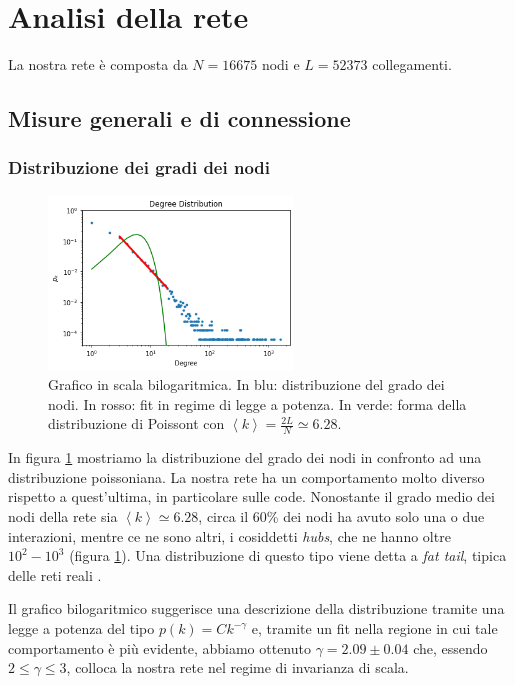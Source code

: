 \section{Analisi della rete}\label{misuregenerali}

    La nostra rete è composta da $N = 16675$ nodi e $L = 52373$ collegamenti.
    
    \subsection{Misure generali e di connessione}
    
    \subsubsection{Distribuzione dei gradi dei nodi}
        
        \begin{figure}[ht]
            \centering
            \includegraphics[width=6.5cm]{3_analysis_network/degree.png}
            \caption{Grafico in scala bilogaritmica. In blu: distribuzione del grado dei nodi. In rosso: fit in regime di legge a potenza. In verde: forma della distribuzione di Poissont con $\left<k\right>=\frac{2L}{N}\simeq6.28$.}
            \label{Degree_distribution}
        \end{figure}
        
        In figura \ref{Degree_distribution} mostriamo la distribuzione del grado dei nodi in confronto ad una distribuzione poissoniana. La nostra rete ha un comportamento molto diverso rispetto a quest'ultima, in particolare sulle code.
        Nonostante il grado medio dei nodi della rete sia $\left< k \right> \simeq 6.28$, circa il 60\% dei nodi ha avuto solo una o due interazioni, mentre ce ne sono altri, i cosiddetti \textit{hubs}, che ne hanno oltre $10^2-10^3$ (figura \ref{Degree_distribution}). Una distribuzione di questo tipo viene detta a \textit{fat tail}, tipica delle reti reali \cite{barabasicap3}.
        
        Il grafico bilogaritmico suggerisce una descrizione della distribuzione tramite una legge a potenza del tipo $p(k)=Ck^{-\gamma}$ e, tramite un fit nella regione in cui tale comportamento è più evidente, abbiamo ottenuto $\gamma=2.09 \pm 0.04$ che, essendo $2 \leq \gamma \leq 3$, colloca la nostra rete nel regime di invarianza di scala.

